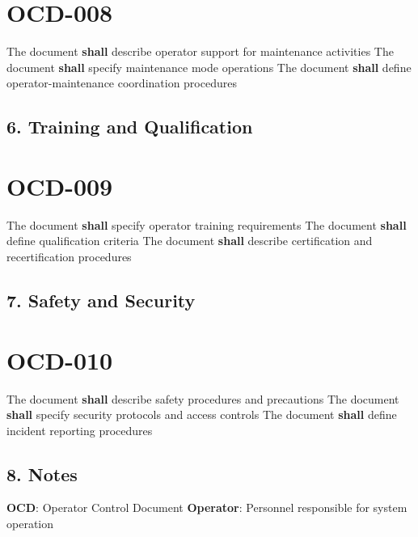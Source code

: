 \section{OCD-008}\label{OCD-008}

The document \textbf{shall} describe operator support for maintenance activities
The document \textbf{shall} specify maintenance mode operations
The document \textbf{shall} define operator-maintenance coordination procedures

\subsection{6. Training and Qualification}

\section{OCD-009}\label{OCD-009}

The document \textbf{shall} specify operator training requirements
The document \textbf{shall} define qualification criteria
The document \textbf{shall} describe certification and recertification procedures

\subsection{7. Safety and Security}

\section{OCD-010}\label{OCD-010}

The document \textbf{shall} describe safety procedures and precautions
The document \textbf{shall} specify security protocols and access controls
The document \textbf{shall} define incident reporting procedures

\subsection{8. Notes}
\textbf{OCD}: Operator Control Document
\textbf{Operator}: Personnel responsible for system operation

